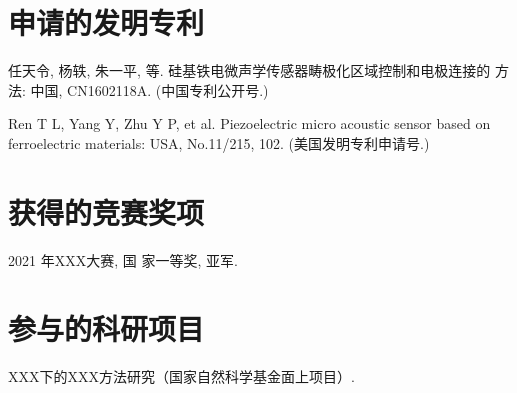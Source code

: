 \begin{resume}
  \section*{申请的发明专利} %
  \begin{enumerate}[label={[\arabic*]},labelsep=6pt,topsep=0pt,partopsep=0pt,
parsep=0pt,itemsep=1pt,leftmargin=0em,itemindent=42pt]
  \item 任天令, 杨轶, 朱一平, 等. 硅基铁电微声学传感器畴极化区域控制和电极连接的
    方法: 中国, CN1602118A. (中国专利公开号.)
  \item Ren T L, Yang Y, Zhu Y P, et al. Piezoelectric micro acoustic sensor
    based on ferroelectric materials: USA, No.11/215, 102. (美国发明专利申请号.)
  \end{enumerate}

  \section*{获得的竞赛奖项} %

\begin{enumerate}[label={[\arabic*]},labelsep=6pt,topsep=0pt,partopsep=0pt,
parsep=0pt,itemsep=1pt,leftmargin=0em,itemindent=42pt]
\normalsize
\item 2021 年XXX大赛, 国
家一等奖, 亚军.
\end{enumerate}

\section*{参与的科研项目} %

  \begin{enumerate}[label={[\arabic*]},labelsep=6pt,topsep=0pt,partopsep=0pt,
  parsep=0pt,itemsep=1pt,leftmargin=0em,itemindent=42pt]
  \normalsize
  \item XXX下的XXX方法研究（国家自然科学基金面上项目）. %
  \end{enumerate}

\fi
\fi
\end{resume}


